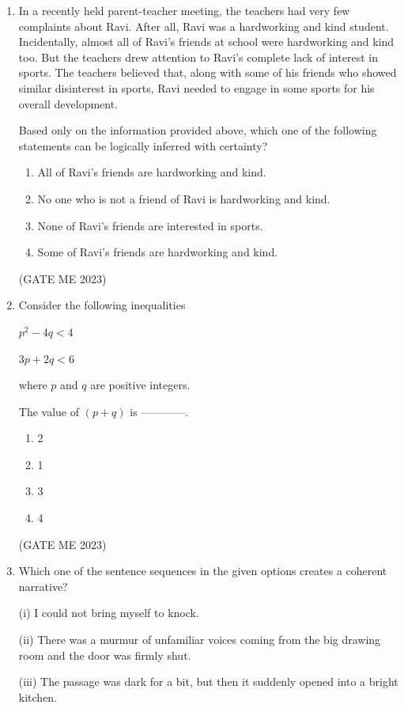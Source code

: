 \documentclass[journal]{IEEEtran}
\begin{document}
\begin{enumerate}
\item In a recently held parent-teacher meeting, the teachers had very few complaints about Ravi. After all, Ravi was a hardworking and kind student. Incidentally, almost all of Ravi’s friends at school were hardworking and kind too. But the teachers drew attention to Ravi’s complete lack of interest in sports. The teachers believed that, along with some of his friends who showed similar disinterest in sports, Ravi needed to engage in some sports for his overall development.

Based only on the information provided above, which one of the following statements can be logically inferred with certainty?

\begin{enumerate}
    \item All of Ravi’s friends are hardworking and kind.
    \item No one who is not a friend of Ravi is hardworking and kind.
    \item None of Ravi’s friends are interested in sports.
    \item Some of Ravi’s friends are hardworking and kind.
\end{enumerate}
\hfill (GATE ME 2023)

\item Consider the following inequalities

$ p^2 - 4q < 4 $

$ 3p + 2q < 6 $

where $ p $ and $ q $ are positive integers.

The value of $ (p + q) $ is ------------.

\begin{enumerate}
    \item 2
    \item 1
    \item 3
    \item 4
\end{enumerate}
\hfill (GATE ME 2023)

\item Which one of the sentence sequences in the given options creates a coherent narrative? 

(i) I could not bring myself to knock. 

(ii) There was a murmur of unfamiliar voices coming from the big drawing room and the door was firmly shut. 

(iii) The passage was dark for a bit, but then it suddenly opened into a bright kitchen. 


\end{enumerate}
\end{document}
